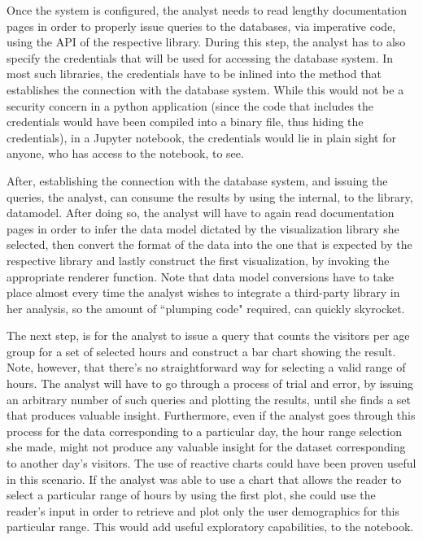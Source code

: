 Once the system is configured, the analyst needs to read lengthy documentation pages in order to properly issue queries to the databases, via imperative code, using the API of the respective library. During this step, the analyst has to also specify the credentials that will be used for accessing the database system. In most such libraries, the credentials have to be inlined into the method that establishes the connection with the database system. While this would not be a security concern in a python application (since the code that includes the credentials would have been compiled into a binary file, thus hiding the credentials), in a Jupyter notebook, the credentials would lie in plain sight for anyone, who has access to the notebook, to see.

After, establishing the connection with the database system, and issuing the queries, the analyst, can consume the results by using the internal, to the library, datamodel. After doing so, the analyst will have to again read documentation pages in order to infer the data model dictated by the visualization library she selected, then convert the format of the data into the one that is expected by the respective library and lastly construct the first visualization, by invoking the appropriate renderer function. Note that data model conversions have to take place almost every time the analyst wishes to integrate a third-party library in her analysis, so the amount of ``plumping code" required, can quickly skyrocket.


The next step, is for the analyst to issue a query that counts the visitors per age group for a set of selected hours and construct a bar chart showing the result. Note, however, that there's no straightforward way for selecting a valid range of hours. The analyst will have to go through a process of trial and error, by issuing an arbitrary number of such queries and plotting the results, until she finds a set that produces valuable insight. Furthermore, even if the analyst goes through this process for the data corresponding to a particular day, the hour range selection she made, might not produce any valuable insight for the dataset corresponding to another day's visitors. The use of reactive charts could have been proven useful in this scenario. If the analyst was able to use a chart that allows the reader to select a particular range of hours by using the first plot, she could use the reader's input in order to retrieve and plot only the user demographics for this particular range. This would add useful exploratory capabilities, to the notebook.

